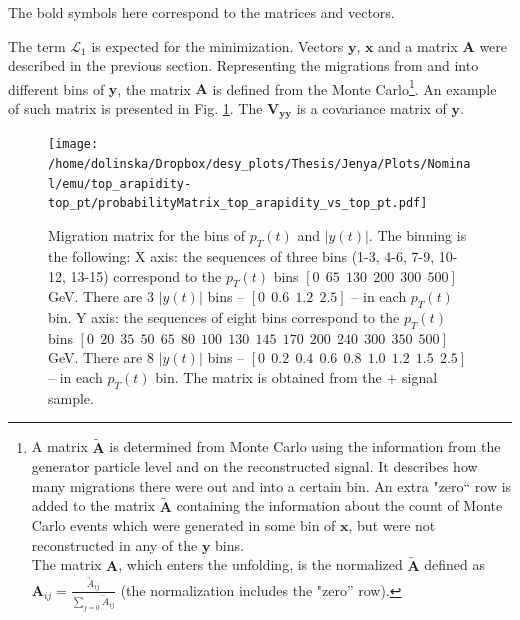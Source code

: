 The bold symbols here correspond to the matrices and vectors.

The term $\mathcal{L}_{1}$ is expected for the minimization. Vectors $\mathbf{y}$, $\mathbf{x}$ and a matrix $\mathbf{A}$ were
described in the previous section. Representing the migrations from and into different bins of $\mathbf{y}$, the matrix $\mathbf{A}$
is defined from the Monte Carlo\footnote{A matrix $\mathbf{\tilde{A}}$ is
determined from Monte Carlo using the information from the generator particle level and on the reconstructed signal. It describes how many 
migrations there were out and into a certain bin. An extra "zero`` row is added
to the matrix $\mathbf{\tilde{A}}$ containing the information about the count of Monte Carlo events which were generated in some bin of $\mathbf{x}$,
but were not reconstructed in any of the $\mathbf{y}$ bins. \\ The matrix $\mathbf{A}$, which enters the unfolding, is the normalized $\mathbf{\tilde{A}}$
defined as $\mathbf{A}_{ij} = \frac{\tilde{A}_{ij}}{\sum_{j=0}\tilde{A}_{ij}}$ (the normalization includes the "zero'' row).}. An example of such matrix 
is presented in Fig. \ref{fig:migMat}. The $\mathbf{V_{yy}}$ is a covariance matrix of $\mathbf{y}$. 

\begin{figure}[p]
  \centering
  \texttt{[image: /home/dolinska/Dropbox/desy\_plots/Thesis/Jenya/Plots/Nominal/emu/top\_arapidity-top\_pt/probabilityMatrix\_top\_arapidity\_vs\_top\_pt.pdf]}
  \caption{Migration matrix for the bins of $p_{T}(t)$ and $|y(t)|$. The binning is the following:
  X axis: the sequences of three bins (1-3, 4-6, 7-9, 10-12, 13-15) correspond to the $p_{T}(t)$ bins $[0\:\:65\:\:130\:\:200\:\:300\:\:500]$ GeV.
          There are 3 $|y(t)|$ bins -- $[0\:\:0.6\:\:1.2\:\:2.5]$ -- in each $p_{T}(t)$ bin.
  Y axis: the sequences of eight bins correspond to the $p_{T}(t)$ bins $[0\:\:20\:\:35\:\:50\:\:65\:\:80\:\:100\:\:130\:\:145\:\:170\:\:200\:\:240\:\:300\:\:350\:\:500]$ GeV.
          There are 8 $|y(t)|$ bins -- $[0\:\:0.2\:\:0.4\:\:0.6\:\:0.8\:\:1.0\:\:1.2\:\:1.5\:\:2.5]$ -- in each $p_{T}(t)$ bin.
  The matrix is obtained from the \MG +  signal sample.}
  \label{fig:migMat}
\end{figure}

